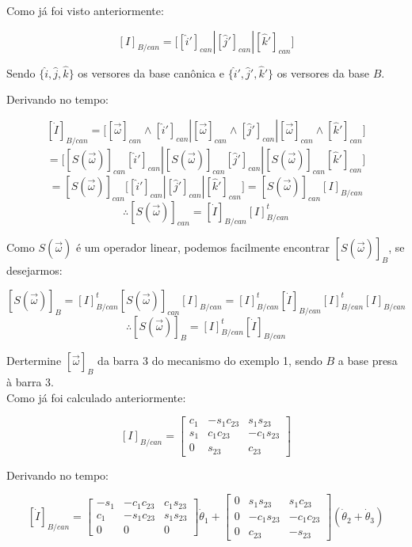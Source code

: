 \documentclass[12pt,a4paper]{article}
\begin{document}
\linebreak

Como já foi visto anteriormente:

$$ [I]_{B/can} = \Big[ [ \hat{i}  ']_{can} | [\hat{j} ']_{can} | [\hat{k} ']_{can} \Big] $$


Sendo $  \{ \hat{i}  , \hat{j} , \hat{k} \} $ os versores da base canônica e $  \{ \hat{i}' , \hat{j}' , \hat{k}' \}  $ os versores da base $B$.

Derivando no tempo:

$$ [\dot{I}]_{B/can} = \Big[  [\vec{\omega}]_{can} \wedge [\hat{i}  ']_{can} | [\vec{\omega}]_{can} \wedge [\hat{j} ']_{can} | [\vec{\omega}]_{can} \wedge [\hat{k} ']_{can} \Big] $$
$$ = \Big[  [S(\vec{\omega})]_{can} [\hat{i}  ']_{can} | [S(\vec{\omega})]_{can}  [\hat{j} ']_{can} | [S(\vec{\omega})]_{can}  [\hat{k} ']_{can} \Big] $$
$$ = [S(\vec{\omega})]_{can} \Big[ [ \hat{i}  ']_{can} | [\hat{j} ']_{can} | [\hat{k} ']_{can} \Big] = [S(\vec{\omega})]_{can} [I]_{B/can}  $$
$$ \therefore [S(\vec{\omega})]_{can} = [\dot{I}]_{B/can} [I]_{B/can}^t  $$
\linebreak

Como $S(\vec{\omega})$ é um operador linear, podemos facilmente encontrar $[S(\vec{\omega})]_B$, se desejarmos:

$$ [S(\vec{\omega})]_B = [I]_{B/can}^t [S(\vec{\omega})]_{can} [I]_{B/can} = [I]_{B/can}^t [\dot{I}]_{B/can} [I]_{B/can}^t [I]_{B/can}   $$
$$ \therefore [S(\vec{\omega})]_B = [I]_{B/can}^t [\dot{I}]_{B/can} $$


Dertermine $[\vec{\omega}]_B$ da barra 3 do mecanismo do exemplo 1, sendo $B$ a base presa à barra 3. \\

Como já foi calculado anteriormente:

$$ [I]_{B/can} =
\begin{bmatrix}
c_1 & -s_1 c_{23} & s_1 s_{23}  \\
s_1 & c_1 c_{23} & -c_1 s_{23}  \\
0 & s_{23} & c_{23} 
\end{bmatrix}
$$

Derivando no tempo:

$$ [\dot{I}]_{B/can} =
\begin{bmatrix}
-s_1 & -c_1 c_{23} & c_1 s_{23}  \\
c_1 & -s_1 c_{23} & s_1 s_{23}  \\
0 & 0 & 0 
\end{bmatrix}
\dot{\theta}_1 +
\begin{bmatrix}
0 & s_1 s_{23} & s_1 c_{23}  \\
0 & -c_1 s_{23} & -c_1 c_{23}  \\
0 & c_{23} & -s_{23} 
\end{bmatrix}
(\dot{\theta}_2 + \dot{\theta}_3)
$$
\end{document}
